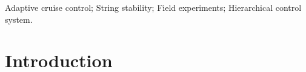 \documentclass[journal]{IEEEtran}
\begin{document}




\begin{IEEEkeywords}
  Adaptive cruise control; String stability; Field experiments; Hierarchical control system.
\end{IEEEkeywords}






%
\IEEEpeerreviewmaketitle

\section{Introduction}
\label{Section 1}
\end{document}
